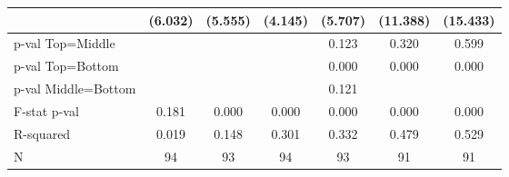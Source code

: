 \begin{tabular}{l*{6}{c}}
                    &     (6.032)&     (5.555)&     (4.145)&     (5.707)&    (11.388)&    (15.433)\\
\midrule
p-val Top=Middle    &            &            &            &       0.123&       0.320&       0.599\\
p-val Top=Bottom    &            &            &            &       0.000&       0.000&       0.000\\
p-val Middle=Bottom &            &            &            &       0.121&            &            \\
F-stat p-val        &       0.181&       0.000&       0.000&       0.000&       0.000&       0.000\\
R-squared           &       0.019&       0.148&       0.301&       0.332&       0.479&       0.529\\
N                   &          94&          93&          94&          93&          91&          91\\
\bottomrule
\end{tabular}
